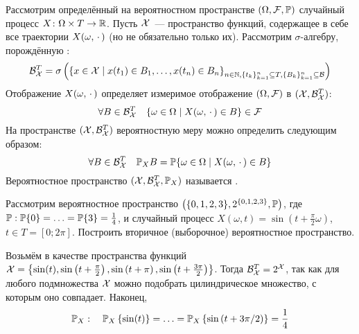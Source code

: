 \begin{definition}
    \label{definition:basics:sampling_space}
    Рассмотрим определённый на вероятностном пространстве $ (\Omega, \mathcal{F}, \mathbb{P}) $ случайный процесс $ X \colon \Omega \times T \to \mathbb{R} $.
    Пусть $ \mathcal{X} $~--- пространство функций, содержащее в себе все траектории $ X(\omega, \, \cdot \,) $ (но не обязательно только их).
    Рассмотрим $ \sigma $-алгебру, порождённую :
    \[
        \mathcal{B}_{\mathcal{X}}^T =
        \sigma\left( \left\{ x \in \mathcal{X} \mid x(t_1) \in B_1, \ldots, x(t_n) \in B_n \right\}_{n \in \mathbb{N}, \{t_k\}_{k=1}^n \subseteq T, \{B_k\}_{k=1}^n \subseteq \mathcal{B}} \right)
    \]
    Отображение $ X(\omega, \, \cdot \,) $ определяет измеримое отображение $ (\Omega, \mathcal{F}) $ в $ (\mathcal{X}, \mathcal{B}_{\mathcal{X}}^T) $:
    \[
        \forall B \in \mathcal{B}_{\mathcal{X}}^T \quad \{ \omega \in \Omega \mid X(\omega, \, \cdot \,) \in B \} \in \mathcal{F}
    \]
    На пространстве $ (\mathcal{X}, \mathcal{B}_{\mathcal{X}}^T) $ вероятностную меру можно определить следующим образом:
    \[
        \forall B \in \mathcal{B}_{\mathcal{X}}^T \quad \mathbb{P}_X B = \mathbb{P} \{ \omega \in \Omega \mid X(\omega, \, \cdot \,) \in B \}
    \]
    Вероятностное пространство $ (\mathcal{X}, \mathcal{B}_{\mathcal{X}}^T, \mathbb{P}_X) $ называется .
\end{definition}

\begin{Exercise}[counter=SecExercise, label={exercise:basics:sampling_space}]
    \noindent
    Рассмотрим вероятностное пространство $ \left( \{0, 1, 2, 3\}, 2^{\{0, 1, 2, 3\}}, \mathbb{P} \right) $,
    где $ \mathbb{P}: \mathbb{P} \{0\} = \ldots = \mathbb{P} \{3\} = \frac{1}{4} $,
    и случайный процесс $ X(\omega, t) = \sin\left( t + \frac{\pi}{2} \omega \right) $, $ t \in T = [0; 2 \pi] $.
    Построить вторичное (выборочное) вероятностное пространство.
\end{Exercise}

\begin{Answer}
    \noindent
    Возьмём в качестве пространства функций $ \mathcal{X} = \left\{ \sin(t), \sin\left( t + \frac{\pi}{2} \right), \sin\left( t + \pi \right), \sin\left( t + \frac{3 \pi}{2} \right) \right\} $.
    Тогда $ \mathcal{B}_{\mathcal{X}}^T = 2^{\mathcal{X}} $,
    так как для любого подмножества $ \mathcal{X} $ можно подобрать цилиндрическое множество, с которым оно совпадает.
    Наконец,
    \[
        \mathbb{P}_X: \quad \mathbb{P}_X \left\{ \sin(t) \right\} = \ldots = \mathbb{P}_X \left\{ \sin\left( t + 3 \pi/2 \right) \right\} = \frac{1}{4}
    \]
\end{Answer}


